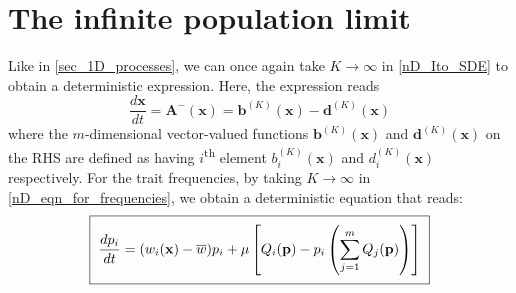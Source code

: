 \section{The infinite population limit}\label{sec_nD_det_limit}
Like in \ref{sec_1D_processes}, we can once again take $K \to \infty$ in \eqref{nD_Ito_SDE} to obtain a deterministic expression. Here, the expression reads
\begin{equation}
\label{nD_det_limit}
\frac{d\mathbf{x}}{dt} = \mathbf{A^-}(\mathbf{x}) = \mathbf{b}^{(K)}(\mathbf{x}) - \mathbf{d}^{(K)}(\mathbf{x})
\end{equation}
where the $m$-dimensional vector-valued functions $\mathbf{b}^{(K)}(\mathbf{x})$ and $\mathbf{d}^{(K)}(\mathbf{x})$ on the RHS are defined as having $i$\textsuperscript{th} element $b^{(K)}_i(\mathbf{x})$ and $d^{(K)}_i(\mathbf{x})$ respectively. For the trait frequencies, by taking $K \to \infty$ in \eqref{nD_eqn_for_frequencies}, we obtain a deterministic equation that reads:
\begin{equation}
\label{nD_replicator_mutator}
\setlength{\fboxsep}{2\fboxsep}\boxed{\frac{dp_i}{dt} = (w_i(\mathbf{x}) - \overline{w})p_i + \mu\left[Q_i(\mathbf{p}) - p_i\left(\sum\limits_{j=1}^{m}Q_j(\mathbf{p})\right)\right]}
\end{equation}
